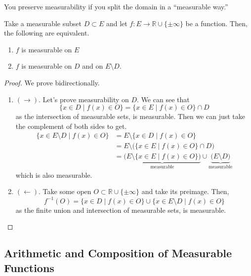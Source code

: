   You preserve measurability if you split the domain in a ``measurable way.'' 

  \begin{theorem}
    Take a measurable subset $D \subset E$ and let $f: E \to \mathbb{R} \cup \{\pm\infty\}$ be a function. Then, the following are equivalent. 
    \begin{enumerate}
      \item $f$ is measurable on $E$ 
      \item $f$ is measurable on $D$ and on $E \setminus D$. 
    \end{enumerate}
  \end{theorem}
  \begin{proof}
    We prove bidirectionally. 
    \begin{enumerate}
      \item $(\rightarrow)$. Let's prove measurability on $D$. We can see that 
      \begin{equation}
        \{x \in D \mid f(x) \in O \} = \{x \in E \mid f(x) \in O \} \cap D
      \end{equation}
      as the intersection of measurable sets, is measurable. Then we can just take the complement of both sides to get. 
      \begin{align}
        \{x \in E \setminus D \mid f(x) \in O\} 
          & = E \setminus \{x \in D \mid f(x) \in O \} \\ 
          & = E \setminus \big( \{x \in E \mid f(x) \in O \} \cap D \big) \\
          & = \underbrace{\big( E \setminus \{x \in E \mid f(x) \in O \} \big)}_{\text{measurable}} \cup \underbrace{\big( E \setminus D \big)}_{\text{measurable}}
      \end{align}
      which is also measurable. 

      \item $(\leftarrow)$. Take some open $O \subset \mathbb{R} \cup \{\pm\infty\}$ and take its preimage. Then, 
      \begin{equation}
        f^{-1} (O) = \{x \in D \mid f(x) \in O\} \cup \{x \in E \setminus D \mid f(x) \in O \}
      \end{equation} 
      as the finite union and intersection of measurable sets, is measurable. 
    \end{enumerate}
  \end{proof}

\subsection{Arithmetic and Composition of Measurable Functions}


